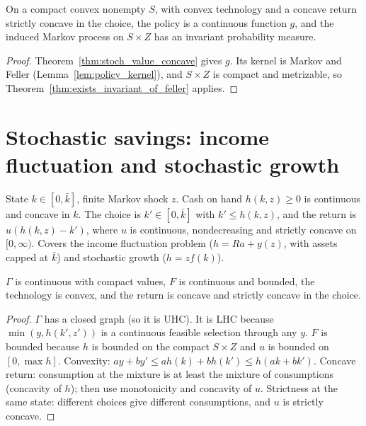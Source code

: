 \begin{theorem}
\label{thm:stoch_exists_stationary}
\leanok
{}
On a compact convex nonempty $S$, with convex technology and a concave return strictly concave in the choice,
the policy is a continuous function $g$, and the induced Markov process on $S \times Z$ has an invariant
probability measure.
\end{theorem}
\begin{proof}
\leanok
Theorem~\ref{thm:stoch_value_concave} gives $g$. Its kernel is Markov and Feller (Lemma~\ref{lem:policy_kernel}),
and $S \times Z$ is compact and metrizable, so Theorem~\ref{thm:exists_invariant_of_feller} applies.
\end{proof}

\section{Stochastic savings: income fluctuation and stochastic growth}
\label{sec:stoch_savings}

\begin{definition}
\label{def:stoch_savings}
\leanok
{}
State $k \in [0,\bar k]$, finite Markov shock $z$. Cash on hand $h(k,z) \ge 0$ is continuous and concave in $k$.
The choice is $k' \in [0,\bar k]$ with $k' \le h(k,z)$, and the return is $u(h(k,z) - k')$, where $u$ is
continuous, nondecreasing and strictly concave on $[0,\infty)$. Covers the income fluctuation problem
($h = Ra + y(z)$, with assets capped at $\bar k$) and stochastic growth ($h = z f(k)$).
\end{definition}

\begin{lemma}
\label{lem:stoch_savings_dp}
\leanok
{}
$\Gamma$ is continuous with compact values, $F$ is continuous and bounded, the technology is convex, and the
return is concave and strictly concave in the choice.
\end{lemma}
\begin{proof}
\leanok
$\Gamma$ has a closed graph (so it is UHC). It is LHC because $\min(y, h(k',z'))$ is a continuous feasible
selection through any $y$. $F$ is bounded because $h$ is bounded on the compact $S \times Z$ and $u$ is bounded on
$[0, \max h]$. Convexity: $a y + b y' \le a h(k) + b h(k') \le h(a k + b k')$. Concave return: consumption at the
mixture is at least the mixture of consumptions (concavity of $h$); then use monotonicity and concavity of $u$.
Strictness at the same state: different choices give different consumptions, and $u$ is strictly concave.
\end{proof}

